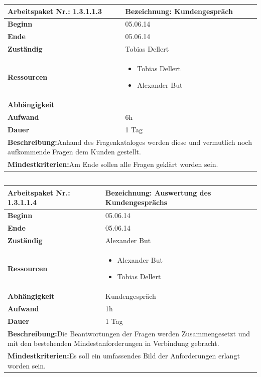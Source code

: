\documentclass[fontsize=12pt,paper=a4,twoside]{scrartcl}
\begin{document}
\begin{tabular}{|p{5.3cm}|p{9.7cm}|}\hline
	\textbf{Arbeitspaket Nr.:} 1.3.1.1.3 & \textbf{Bezeichnung:} Kundengespräch\\ \hline \hline
	\textbf{Beginn} & 05.06.14\\ \hline
	\textbf{Ende} & 05.06.14\\ \hline
	\textbf{Zuständig} & Tobias Dellert\\ \hline
	\textbf{Ressourcen} & \begin{itemize}
		\item Tobias Dellert
		\item Alexander But
	\end{itemize}    \\ \hline
	\textbf{Abhängigkeit} &\\ \hline
	\textbf{Aufwand} & 6h\\ \hline
	\textbf{Dauer} & 1 Tag\\ \hline
	\multicolumn{2}{|p{15cm}|}{\textbf{Beschreibung:}\newline Anhand des Fragenkataloges werden diese und vermutlich noch aufkommende Fragen dem Kunden gestellt. }\\ \hline
	\multicolumn{2}{|p{15cm}|}{\textbf{Mindestkriterien:}\newline Am Ende sollen alle Fragen geklärt worden sein. }\\ \hline
\end{tabular}

\begin{verbatim} 
\end{verbatim}

\begin{tabular}{|p{5.3cm}|p{9.7cm}|}\hline
	\textbf{Arbeitspaket Nr.:} 1.3.1.1.4 & \textbf{Bezeichnung:} Auswertung des Kundengesprächs\\ \hline \hline
	\textbf{Beginn} & 05.06.14\\ \hline
	\textbf{Ende} & 05.06.14\\ \hline
	\textbf{Zuständig} & Alexander But\\ \hline
	\textbf{Ressourcen} & \begin{itemize}
		\item Alexander But
		\item Tobias Dellert
	\end{itemize}    \\ \hline
	\textbf{Abhängigkeit} & Kundengespräch\\ \hline
	\textbf{Aufwand} & 1h\\ \hline
	\textbf{Dauer} & 1 Tag\\ \hline
	\multicolumn{2}{|p{15cm}|}{\textbf{Beschreibung:}\newline Die Beantwortungen der Fragen werden Zusammengesetzt und mit den bestehenden Mindestanforderungen in Verbindung gebracht. }\\ \hline
	\multicolumn{2}{|p{15cm}|}{\textbf{Mindestkriterien:}\newline Es soll ein umfassendes Bild der Anforderungen erlangt worden sein. }\\ \hline
\end{tabular}
\end{document}
